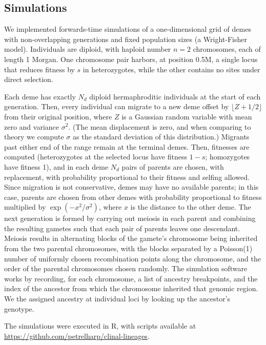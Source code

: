 \documentclass[11pt,letterpaper]{article}
\begin{document}
\subsection*{Simulations}

We implemented forwards-time simulations of a one-dimensional grid of demes
with non-overlapping generations and fixed population sizes (a Wright-Fisher model). Individuals are diploid, with haploid number $n=2$ chromosomes, each of length 1 Morgan. One chromosome pair harbors, at position 0.5M, a single locus that reduces fitness by $s$ in heterozygotes, while the other contains no sites under direct selection.

Each deme has exactly $N_d$ diploid hermaphroditic individuals at the start of each generation.
Then, every individual can migrate to a new deme  offset by $\lfloor Z + 1/2 \rfloor$ from their original position,
where $Z$ is a Gaussian random variable with mean zero and variance $\sigma^2$.
(The mean displacement is zero, and when comparing to theory we compute $\sigma$ as the standard deviation of this distribution.)
Migrants past either end of the range remain at the terminal demes.
Then, 
fitnesses are computed (heterozygotes at the selected locus have fitness $1-s$; homozygotes have fitness 1),
and in each deme $N_d$ pairs of parents are chosen, with replacement,
with probability proportional to their fitness and selfing allowed.
Since migration is not conservative, demes may have no available parents;
in this case, parents are chosen from other demes with probability proportional to fitness
multiplied by $\exp(-x^2/\sigma^2)$, where $x$ is the distance to the other deme.
The next generation is formed by carrying out meiosis in each parent
and combining the resulting gametes such that each pair of parents leaves one descendant.
Meiosis results in alternating blocks of the gamete's chromosome
being inherited from the two parental chromosomes,
with the blocks separated by a Poisson(1) number of uniformly chosen recombination points along the chromosome,
and the order of the parental chromosomes chosen randomly.
The simulation software works by recording, for each chromosome, 
a list of ancestry breakpoints, and the index of the ancestor from which 
the chromosome inherited that genomic region.
We the assigned ancestry at individual loci by looking up the ancestor's genotype. 

The simulations were executed in R, with scripts available at
\url{https://github.com/petrelharp/clinal-lineages}.
\end{document}
